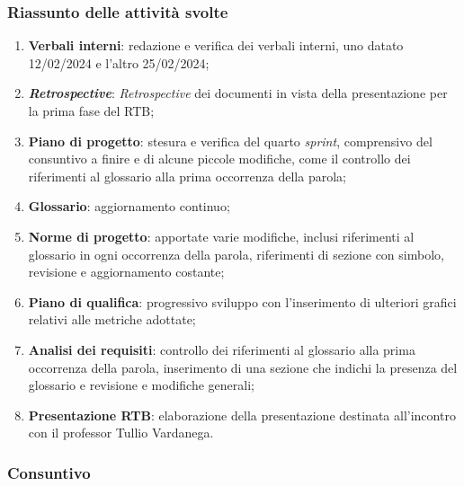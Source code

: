 \subsubsection{Riassunto delle attività svolte}
\begin{enumerate}
	\item \textbf{Verbali interni}: redazione e verifica dei verbali interni, uno datato 12/02/2024 e l'altro 25/02/2024;

	\item \textit{\textbf{Retrospective}}: \textit{Retrospective}  dei documenti in vista della presentazione per la prima fase del RTB;

	\item \textbf{Piano di progetto}: stesura e verifica del quarto \textit{sprint}, comprensivo del consuntivo a finire e di alcune piccole modifiche, 
			come il controllo dei riferimenti al glossario alla prima occorrenza della parola;

	\item \textbf{Glossario}: aggiornamento continuo;
	
	\item \textbf{Norme di progetto}: apportate varie modifiche, inclusi riferimenti al glossario in ogni occorrenza della parola, 
			riferimenti di sezione con simbolo, revisione e aggiornamento costante;

	\item \textbf{Piano di qualifica}: progressivo sviluppo con l'inserimento di ulteriori grafici relativi alle metriche adottate;

	\item \textbf{Analisi dei requisiti}: controllo dei riferimenti al glossario alla prima occorrenza della parola, inserimento di una sezione che indichi la presenza del glossario e revisione e modifiche generali;

	\item \textbf{Presentazione RTB}: elaborazione della presentazione destinata all'incontro con il professor Tullio Vardanega.		
\end{enumerate}

\subsubsection{Consuntivo}

